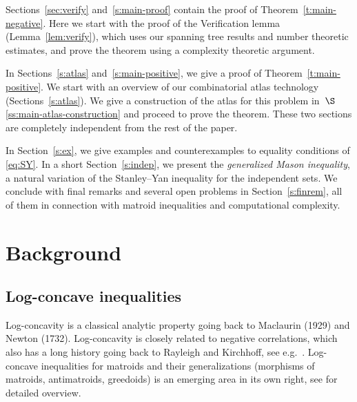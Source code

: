 \documentclass[11pt]{amsart}
\theoremstyle{definition}
\numberwithin{figure}{section}
\numberwithin{equation}{section}
\begin{document}
Sections~\ref{sec:verify} and~\ref{s:main-proof} contain the proof of
Theorem~\ref{t:main-negative}.  Here we start with the proof of the
Verification lemma (Lemma~\ref{lem:verify}), which uses our spanning
tree results and number theoretic estimates, and prove the theorem
using a complexity theoretic argument.

In Sections~\ref{s:atlas} and~\ref{s:main-positive}, we give a proof
of Theorem~\ref{t:main-positive}.  We start with an overview of our
combinatorial atlas technology (Sections~\ref{s:atlas}).  We give a
construction of the atlas for this problem in~$\S$\ref{ss:main-atlas-construction}
and proceed to prove the theorem.  These two sections are completely
independent from the rest of the paper.


In Section~\ref{s:ex},
 we give  examples and  counterexamples to
equality conditions of \eqref{eq:SY}.  In a short Section~\ref{s:indep},
we present the \emph{generalized Mason inequality}, a natural variation of the
Stanley--Yan inequality for the independent sets.  We conclude with final remarks and
several open problems in Section~\ref{s:finrem}, all of them in  connection
with matroid inequalities and computational complexity.

\medskip


\section{Background}\label{s:hist}
%

\subsection{Log-concave inequalities}\label{ss:hist-log}
Log-concavity is a classical analytic property going back
to Maclaurin (1929) and Newton (1732).   Log-concavity is closely related
to negative correlations, which also has a long history going back to Rayleigh
and Kirchhoff, see e.g.\ \cite{BBL09}.
%
Log-concave inequalities for matroids
and their generalizations (morphisms of matroids, antimatroids, greedoids)
is an emerging area in its own right, see \cite{CP,Yan23} for detailed overview.
\end{document}
